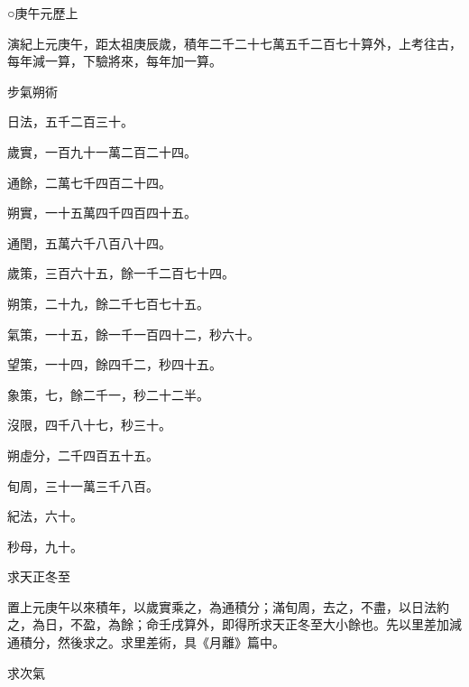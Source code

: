 
\begin{pinyinscope}

 ○庚午元歷上



 演紀上元庚午，距太祖庚辰歲，積年二千二十七萬五千二百七十算外，上考往古，每年減一算，下驗將來，每年加一算。



 步氣朔術



 日法，五千二百三十。



 歲實，一百九十一萬二百二十四。



 通餘，二萬七千四百二十四。



 朔實，一十五萬四千四百四十五。



 通閏，五萬六千八百八十四。



 歲策，三百六十五，餘一千二百七十四。



 朔策，二十九，餘二千七百七十五。



 氣策，一十五，餘一千一百四十二，秒六十。



 望策，一十四，餘四千二，秒四十五。



 象策，七，餘二千一，秒二十二半。



 沒限，四千八十七，秒三十。



 朔虛分，二千四百五十五。



 旬周，三十一萬三千八百。



 紀法，六十。



 秒母，九十。



 求天正冬至



 置上元庚午以來積年，以歲實乘之，為通積分；滿旬周，去之，不盡，以日法約之，為日，不盈，為餘；命壬戌算外，即得所求天正冬至大小餘也。先以里差加減通積分，然後求之。求里差術，具《月離》篇中。



 求次氣




\end{pinyinscope}
